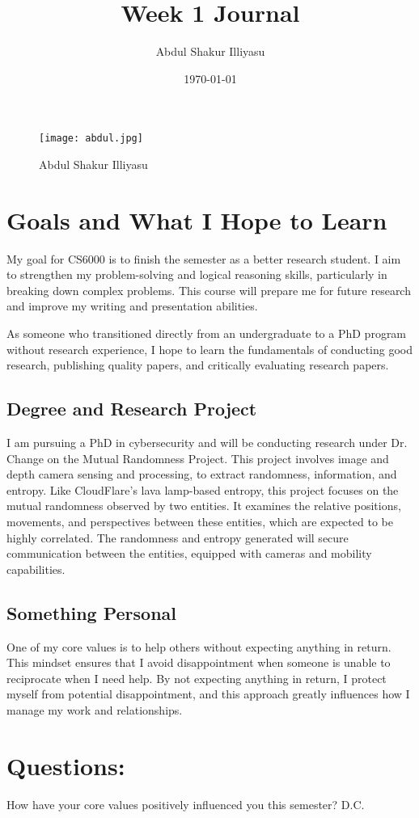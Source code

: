 \documentclass{article}
\title{Week 1 Journal}
\author{Abdul Shakur Illiyasu}
\date{\today}
\begin{document}
\maketitle

\begin{figure}[ht]
    \centering
    \texttt{[image: abdul.jpg]}
    \caption{Abdul Shakur Illiyasu}
    \label{fig: picture.jpg}
\end{figure}

\section{Goals and What I Hope to Learn}

My goal for CS6000 is to finish the semester as a better research student. I aim to strengthen my problem-solving and logical reasoning skills, particularly in breaking down complex problems. This course will prepare me for future research and improve my writing and presentation abilities.

As someone who transitioned directly from an undergraduate to a PhD program without research experience, I hope to learn the fundamentals of conducting good research, publishing quality papers, and critically evaluating research papers.

\subsection{Degree and Research Project}
I am pursuing a PhD in cybersecurity and will be conducting research under Dr. Change on the Mutual Randomness Project. This project involves image and depth camera sensing and processing, to extract randomness, information, and entropy. Like CloudFlare’s lava lamp-based entropy, this project focuses on the mutual randomness observed by two entities. It examines the relative positions, movements, and perspectives between these entities, which are expected to be highly correlated. The randomness and entropy generated will secure communication between the entities, equipped with cameras and mobility capabilities.

\subsection {Something Personal}
One of my core values is to help others without expecting anything in return. This mindset ensures that I avoid disappointment when someone is unable to reciprocate when I need help. By not expecting anything in return, I protect myself from potential disappointment, and this approach greatly influences how I manage my work and relationships.




\section*{Questions: }

How have your core values positively influenced you this semester? D.C.
\end{document}
